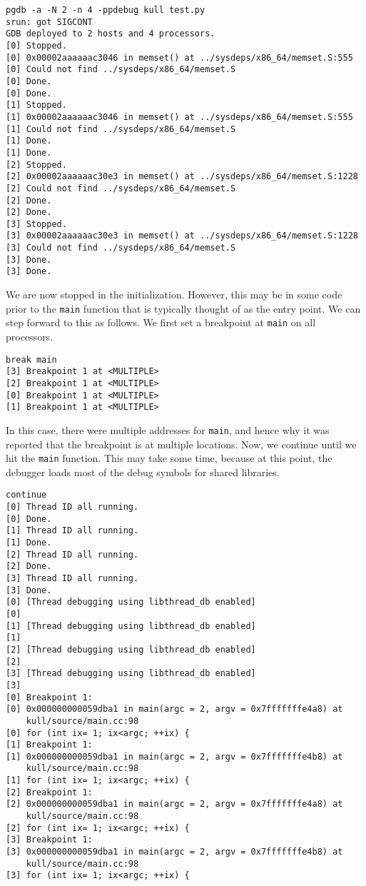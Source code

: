 \documentclass{refart}
\begin{document}
\begin{Verbatim}
pgdb -a -N 2 -n 4 -ppdebug kull test.py
srun: got SIGCONT
GDB deployed to 2 hosts and 4 processors.
[0] Stopped.
[0] 0x00002aaaaaac3046 in memset() at ../sysdeps/x86_64/memset.S:555
[0] Could not find ../sysdeps/x86_64/memset.S
[0] Done.
[0] Done.
[1] Stopped.
[1] 0x00002aaaaaac3046 in memset() at ../sysdeps/x86_64/memset.S:555
[1] Could not find ../sysdeps/x86_64/memset.S
[1] Done.
[1] Done.
[2] Stopped.
[2] 0x00002aaaaaac30e3 in memset() at ../sysdeps/x86_64/memset.S:1228
[2] Could not find ../sysdeps/x86_64/memset.S
[2] Done.
[2] Done.
[3] Stopped.
[3] 0x00002aaaaaac30e3 in memset() at ../sysdeps/x86_64/memset.S:1228
[3] Could not find ../sysdeps/x86_64/memset.S
[3] Done.
[3] Done.
\end{Verbatim}

We are now stopped in the initialization. However, this may be in some code prior to the \texttt{main} function that is typically thought of as the entry point. We can step forward to this as follows. We first set a breakpoint at \texttt{main} on all processors.

\begin{Verbatim}
break main
[3] Breakpoint 1 at <MULTIPLE>
[2] Breakpoint 1 at <MULTIPLE>
[0] Breakpoint 1 at <MULTIPLE>
[1] Breakpoint 1 at <MULTIPLE>
\end{Verbatim}

In this case, there were multiple addresses for \texttt{main}, and hence why it was reported that the breakpoint is at multiple locations. Now, we continue until we hit the \texttt{main} function. This may take some time, because at this point, the debugger loads most of the debug symbols for shared libraries.

\begin{Verbatim}
continue
[0] Thread ID all running.
[0] Done.
[1] Thread ID all running.
[1] Done.
[2] Thread ID all running.
[2] Done.
[3] Thread ID all running.
[3] Done.
[0] [Thread debugging using libthread_db enabled]
[0] 
[1] [Thread debugging using libthread_db enabled]
[1] 
[2] [Thread debugging using libthread_db enabled]
[2] 
[3] [Thread debugging using libthread_db enabled]
[3] 
[0] Breakpoint 1:
[0] 0x000000000059dba1 in main(argc = 2, argv = 0x7fffffffe4a8) at
    kull/source/main.cc:98
[0] for (int ix= 1; ix<argc; ++ix) {
[1] Breakpoint 1:
[1] 0x000000000059dba1 in main(argc = 2, argv = 0x7fffffffe4b8) at
    kull/source/main.cc:98
[1] for (int ix= 1; ix<argc; ++ix) {
[2] Breakpoint 1:
[2] 0x000000000059dba1 in main(argc = 2, argv = 0x7fffffffe4a8) at
    kull/source/main.cc:98
[2] for (int ix= 1; ix<argc; ++ix) {
[3] Breakpoint 1:
[3] 0x000000000059dba1 in main(argc = 2, argv = 0x7fffffffe4b8) at
    kull/source/main.cc:98
[3] for (int ix= 1; ix<argc; ++ix) {
\end{Verbatim}
\end{document}
